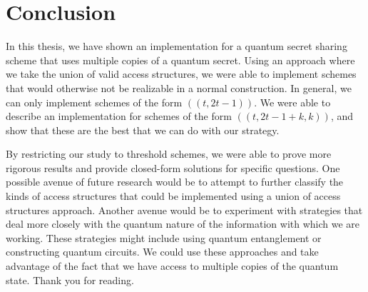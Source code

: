\chapter*{Conclusion}
\label{conclusion}

In this thesis, we have shown an implementation for a quantum secret sharing scheme that uses multiple copies of a quantum secret. Using an approach where we take the union of valid access structures, we were able to implement schemes that would otherwise not be realizable in a normal construction. In general, we can only implement schemes of the form $((t,2t-1))$. We were able to describe an implementation for schemes of the form $((t,2t-1+k,k))$, and show that these are the best that we can do with our strategy.

By restricting our study to threshold schemes, we were able to prove more rigorous results and provide closed-form solutions for specific questions. One possible avenue of future research would be to attempt to further classify the kinds of access structures that could be implemented using a union of access structures approach. Another avenue would be to experiment with strategies that deal more closely with the quantum nature of the information with which we are working. These strategies might include using quantum entanglement or constructing quantum circuits. We could use these approaches and take advantage of the fact that we have access to multiple copies of the quantum state. Thank you for reading.